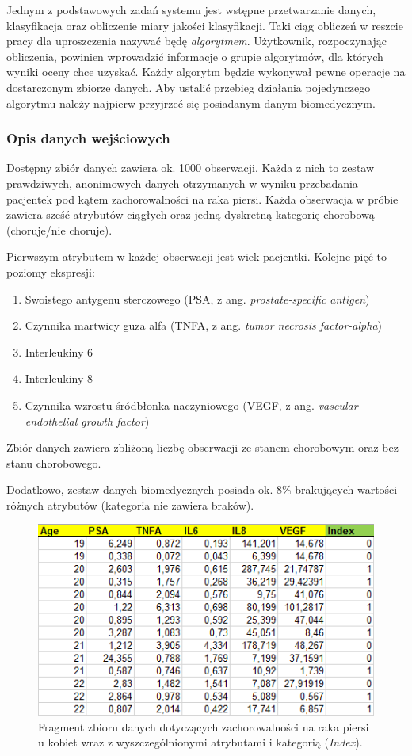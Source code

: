 \documentclass[../thesis.tex]{subfiles}
\begin{document}
Jednym z podstawowych zadań systemu jest wstępne przetwarzanie danych, klasyfikacja oraz obliczenie miary jakości klasyfikacji. Taki ciąg obliczeń w reszcie pracy dla uproszczenia nazywać będę \emph{algorytmem}. Użytkownik, rozpoczynając obliczenia, powinien wprowadzić informacje o grupie algorytmów, dla których wyniki oceny chce uzyskać. Każdy algorytm będzie wykonywał pewne operacje na dostarczonym zbiorze danych. Aby ustalić przebieg działania pojedynczego algorytmu należy najpierw przyjrzeć się posiadanym danym biomedycznym.

\subsubsection{Opis danych wejściowych}

Dostępny zbiór danych zawiera ok. 1000 obserwacji. Każda z nich to zestaw prawdziwych, anonimowych danych otrzymanych w wyniku przebadania pacjentek pod kątem zachorowalności na raka piersi. Każda obserwacja w próbie zawiera sześć atrybutów ciągłych oraz jedną dyskretną kategorię chorobową (choruje/nie choruje). 

Pierwszym atrybutem w każdej obserwacji jest wiek pacjentki. Kolejne pięć to poziomy ekspresji:
\begin{enumerate}
  \item Swoistego antygenu sterczowego (PSA, z ang. \emph{prostate-specific antigen})
  \item Czynnika martwicy guza alfa (TNFA, z ang. \emph{tumor necrosis factor-alpha})
  \item Interleukiny 6
  \item Interleukiny 8
  \item Czynnika wzrostu śródbłonka naczyniowego (VEGF, z ang. \emph{vascular endothelial growth factor})
\end{enumerate}
Zbiór danych zawiera zbliżoną liczbę obserwacji ze stanem chorobowym oraz bez stanu chorobowego.

Dodatkowo, zestaw danych biomedycznych posiada ok. 8\% brakujących wartości różnych atrybutów (kategoria nie zawiera braków).

\begin{figure}[h]
\centering
\includegraphics{data.png}
\caption{Fragment zbioru danych dotyczących zachorowalności na raka piersi u kobiet wraz z wyszczególnionymi atrybutami i kategorią (\textit{Index}).}
\label{req:data}
\end{figure}
\end{document}

